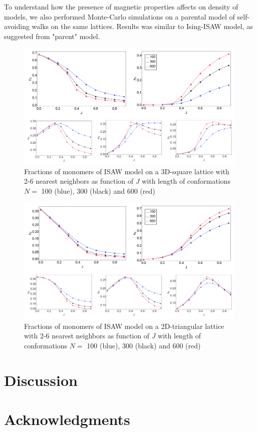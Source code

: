 \documentclass[aps,pre,amssymb,amsmath,twocolumn,floatfix]{revtex4-2}
\begin{document}
To understand how the presence of magnetic properties affects on density of models, we also performed Monte-Carlo simulations on a parental model of self-avoiding walks on the same lattices. Results was similar to Ising-ISAW model, as suggested from "parent" model.

\begin{figure}
    \centering
    \includegraphics[keepaspectratio=True, width=0.99\textwidth]{Images/ISAW_3D_Complex.png}
    \caption{Fractions of monomers of ISAW model on a 3D-square lattice with 2-6 nearest neighbors as function of $J$ with length of conformations $N = $ 100 (blue), 300 (black) and 600 (red)}
    \label{fig:ISAW3D}
\end{figure}

\begin{figure}
    \centering
    \includegraphics[keepaspectratio=True, width=0.99\textwidth]{Images/TrISAW_Complex.png}
    \caption{Fractions of monomers of ISAW model on a 2D-triangular lattice with 2-6 nearest neighbors as function of $J$ with length of conformations $N = $ 100 (blue), 300 (black) and 600 (red)}
    \label{fig:ISAW3D}
\end{figure}

\section{Discussion}

\section{Acknowledgments}

\newpage


\end{document}
